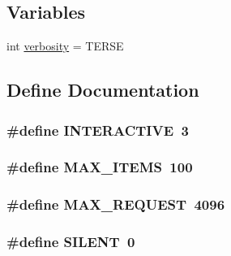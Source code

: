 \subsection*{Variables}
\begin{DoxyCompactItemize}
\item 
int \hyperlink{buddy-test_8c_a1bdcfae3209cbd96db35a2ae356fa15e}{verbosity} = TERSE
\end{DoxyCompactItemize}


\subsection{Define Documentation}
\hypertarget{buddy-test_8c_aa68dfac40a260bde9272c46bdf82613a}{
\subsubsection[{INTERACTIVE}]{\setlength{\rightskip}{0pt plus 5cm}\#define INTERACTIVE~3}}
\label{buddy-test_8c_aa68dfac40a260bde9272c46bdf82613a}
\hypertarget{buddy-test_8c_a1b40ceb455086d9cdb68ed3d3bf2775f}{
\subsubsection[{MAX\_\-ITEMS}]{\setlength{\rightskip}{0pt plus 5cm}\#define MAX\_\-ITEMS~100}}
\label{buddy-test_8c_a1b40ceb455086d9cdb68ed3d3bf2775f}
\hypertarget{buddy-test_8c_a79dc55ceff5acfd97aabd01db632a266}{
\subsubsection[{MAX\_\-REQUEST}]{\setlength{\rightskip}{0pt plus 5cm}\#define MAX\_\-REQUEST~4096}}
\label{buddy-test_8c_a79dc55ceff5acfd97aabd01db632a266}
\hypertarget{buddy-test_8c_a404d5107b2cc06d2e236b7320df1fa7d}{
\subsubsection[{SILENT}]{\setlength{\rightskip}{0pt plus 5cm}\#define SILENT~0}}
